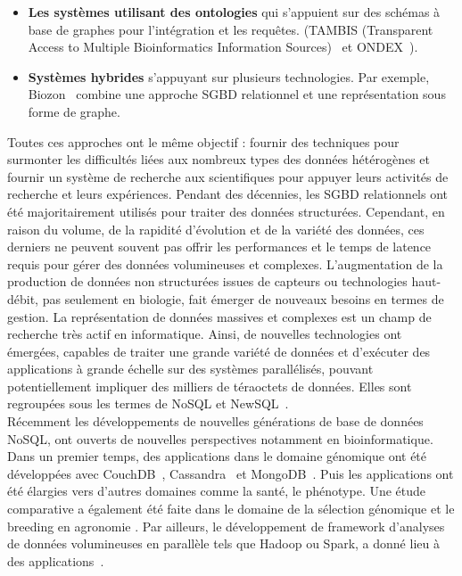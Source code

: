 \begin{itemize}
 \item \textbf{Les systèmes utilisant des ontologies} qui s'appuient sur des schémas à base de graphes pour l'intégration et les requêtes. (TAMBIS (Transparent Access to Multiple Bioinformatics Information Sources)~\cite{tambis} et ONDEX~\cite{ondex_2006,ondex_2011,Taubert2014}).\\
 
 \item \textbf{Systèmes hybrides} s'appuyant sur plusieurs technologies. Par exemple, Biozon~\cite{biozon2006} combine une approche SGBD relationnel et une représentation sous forme de graphe.\\
  
\end{itemize}

Toutes ces approches ont le même objectif : fournir des techniques pour surmonter les difficultés liées aux nombreux types des données hétérogènes et fournir un système de recherche aux scientifiques pour appuyer leurs activités de recherche et leurs expériences.
Pendant des décennies, les SGBD relationnels ont été majoritairement utilisés pour traiter des données structurées. Cependant, en raison du volume, de la rapidité d'évolution et de la variété des données, ces derniers ne peuvent souvent pas offrir les performances et le temps de latence requis pour gérer des données volumineuses et complexes. L'augmentation de la production de données non structurées issues de capteurs ou technologies haut-débit, pas seulement en biologie, fait émerger de nouveaux besoins en termes de gestion. La représentation de données massives et complexes est un champ de recherche très actif en informatique. Ainsi, de nouvelles technologies ont émergées, capables de traiter une grande variété de données et d’exécuter des applications à grande échelle sur des systèmes parallélisés, pouvant potentiellement impliquer des milliers de téraoctets de données. Elles sont regroupées sous les termes de NoSQL et NewSQL~\cite{Gajendran2012, Grolinger2013,MoniruzzamanH13}.\\

Récemment les développements de nouvelles générations de base de données NoSQL, ont ouverts de nouvelles perspectives notamment en bioinformatique. Dans un premier temps, des applications dans le domaine génomique ont été développées avec CouchDB~\cite{Manyam2012,Aniceto2015}, Cassandra~\cite{Gabetta2015} et MongoDB~\cite{Sempere2016}. Puis les applications ont été élargies vers d'autres domaines comme la santé, le phénotype. Une étude comparative a également été faite dans le domaine de la sélection génomique et le breeding en agronomie \cite{benchmarking2019}. Par ailleurs, le développement de framework d'analyses de données volumineuses en parallèle tels que Hadoop ou Spark, a donné lieu à des applications~\cite{Schumacher2014,Nordberg2013,Taylor2010}.\\

